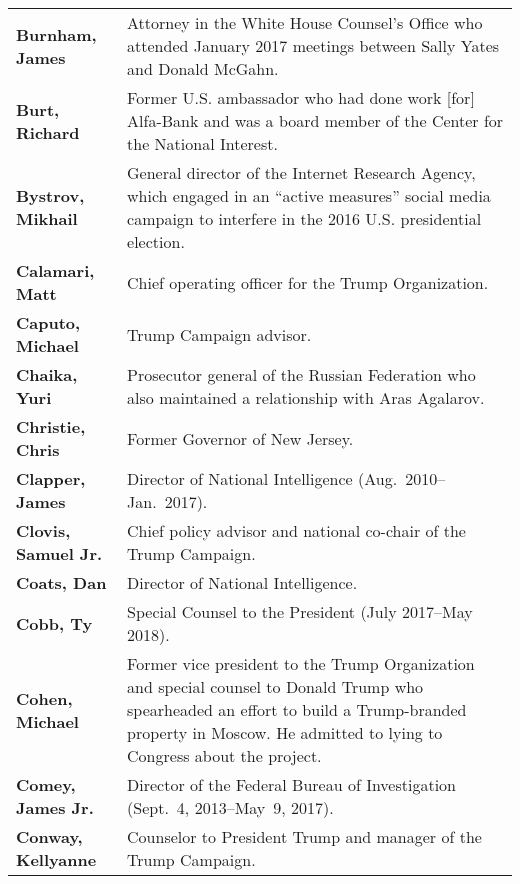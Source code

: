 \begin{longtable}{ p{} p{} }
    \textbf{Burnham, James} & Attorney in the White House Counsel's Office who attended January 2017 meetings between Sally Yates and Donald McGahn. \\

    \textbf{Burt, Richard} & Former U.S. ambassador who had done work [for] Alfa-Bank and was a board member of the Center for the National Interest. \\

    \textbf{Bystrov, Mikhail} & General director of the Internet Research Agency, which engaged in an ``active measures'' social media campaign to interfere in the 2016 U.S. presidential election. \\

    \textbf{Calamari, Matt} & Chief operating officer for the Trump Organization. \\

    \textbf{Caputo, Michael} & Trump Campaign advisor. \\

    \textbf{Chaika, Yuri} & Prosecutor general of the Russian Federation who also maintained a relationship with Aras Agalarov. \\

    \textbf{Christie, Chris} & Former Governor of New Jersey. \\

    \textbf{Clapper, James} & Director of National Intelligence (Aug.~2010--Jan.~2017). \\

    \textbf{Clovis, Samuel Jr.} & Chief policy advisor and national co-chair of the Trump Campaign. \\

    \textbf{Coats, Dan} & Director of National Intelligence. \\

    \textbf{Cobb, Ty} & Special Counsel to the President (July 2017--May 2018). \\

    \textbf{Cohen, Michael} & Former vice president to the Trump Organization and special counsel to Donald Trump who spearheaded an effort to build a Trump-branded property in Moscow. He admitted to lying to Congress about the project. \\

    \textbf{Comey, James Jr.} & Director of the Federal Bureau of Investigation (Sept.~4, 2013--May~9, 2017). \\

    \textbf{Conway, Kellyanne} & Counselor to President Trump and manager of the Trump Campaign. \\


\end{longtable}
